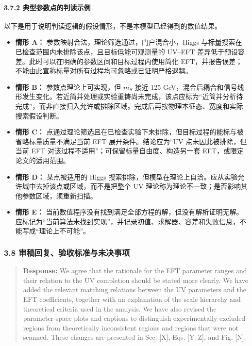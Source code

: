 \documentclass[
]{article}
\providecommand{\tightlist}{%
  \setlength{\itemsep}{0pt}\setlength{\parskip}{0pt}}
\begin{document}
\paragraph{3.7.2
典型参数点的判读示例}\label{ux5178ux578bux53c2ux6570ux70b9ux7684ux5224ux8bfbux793aux4f8b}

以下是用于说明判读逻辑的假设情形，不是本模型已经得到的数值结果。

\begin{itemize}
\tightlist
\item
  \textbf{情形 A：} 参数映射合法，理论筛选通过，门户混合小，Higgs
  与标量搜索在已检查范围内未排除该点，且目标低能可观测量的 UV--EFT
  差异低于预设容差。此时可以在明确的参数区间和目标过程内使用简化
  EFT，并报告误差；不能由此宣称标量对所有过程均可忽略或已证明严格退耦。
\item
  \textbf{情形 B：} 参数点理论上可实现，但 \(m_S\) 接近 125
  GeV，混合后耦合和信号线形发生变化。若近简并处理或实验重铸尚未完成，该点应标为``近简并分析待完成''，而非直接归入允许或排除区域。完成后再按物理本征态、宽度和实际搜索假设判断。
\item
  \textbf{情形 C：}
  点通过理论筛选且在已检查实验下未排除，但目标过程的能标与被省略标量质量不满足当前
  EFT 展开条件。结论应为``UV 点未因此被排除，但当前 EFT
  对该过程不适用''；可保留标量自由度、构造另一套
  EFT，或限定论文的适用范围。
\item
  \textbf{情形 D：} 某点被适用的 Higgs
  搜索排除，但模型在理论上自洽。应从实验允许域中去掉该点或区域，而不是把整个
  UV 理论称为理论不一致；是否影响其他参数区域，须重新扫描。
\item
  \textbf{情形 E：}
  当前数值程序没有找到满足全部方程的解，但没有解析证明无解。应标记为``当前算法未找到实现''，并记录初值、求解器、容差和失败信息，不能写成``理论上不可能''。
\end{itemize}

\subsubsection{3.8
审稿回复、验收标准与未决事项}\label{ux5ba1ux7a3fux56deux590dux9a8cux6536ux6807ux51c6ux4e0eux672aux51b3ux4e8bux9879-1}

\begin{quote}
\textbf{Response:} We agree that the rationale for the EFT parameter
ranges and their relation to the UV completion should be stated more
clearly. We have added the relevant matching relations between the UV
parameters and the EFT coefficients, together with an explanation of the
scale hierarchy and theoretical criteria used in the analysis. We have
also revised the parameter-space plots and captions to distinguish
experimentally excluded regions from theoretically inconsistent regions
and regions that were not scanned. These changes are presented in Sec.
{[}X{]}, Eqs. {[}Y--Z{]}, and Fig. {[}N{]}.
\end{quote}
\end{document}
